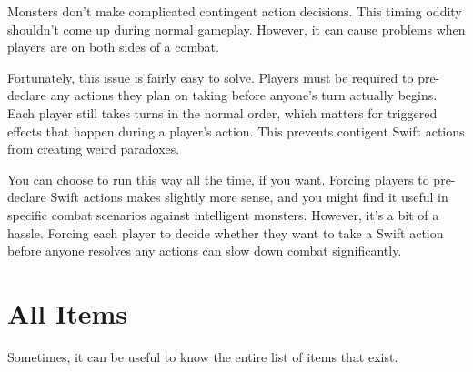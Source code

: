   Monsters don't make complicated contingent action decisions.
  This timing oddity shouldn't come up during normal gameplay.
  However, it can cause problems when players are on both sides of a combat.

  Fortunately, this issue is fairly easy to solve.
  Players must be required to pre-declare any  actions they plan on taking before anyone's turn actually begins.
  Each player still takes turns in the normal order, which matters for triggered effects that happen during a player's action.
  This prevents contigent Swift actions from creating weird paradoxes.

  You can choose to run this way all the time, if you want.
  Forcing players to pre-declare Swift actions makes slightly more sense, and you might find it useful in specific combat scenarios against intelligent monsters.
  However, it's a bit of a hassle.
  Forcing each player to decide whether they want to take a Swift action before anyone resolves any actions can slow down combat significantly.

\section{All Items}

  Sometimes, it can be useful to know the entire list of items that exist.

  \begin{longcolumn}
    
  \end{longcolumn}
